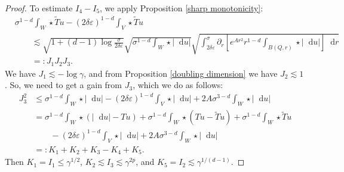 \documentclass[reqno,12pt,letterpaper]{amsart}
\newcommand*\dif{\mathop{}\!\mathrm{d}}
\theoremstyle{definition}
\numberwithin{equation}{section}
\begin{document}
\begin{proof}
To estimate $I_4 - I_5$, we apply Proposition \ref{sharp monotonicity}:
\begin{align*}
&\sigma^{1 - d} \int_W \star \tilde T u - (2\delta\varepsilon)^{1 - d} \int_V \star \tilde T u \\
&\qquad \lesssim \sqrt{1 + (d - 1) \log \frac{\sigma}{2\delta\varepsilon}} \sqrt{\sigma^{1 - d} \int_W \star |\dif u|} \sqrt{\int_{2\delta\varepsilon}^\sigma \partial_r \left[e^{Ar^2} r^{1 - d} \int_{B(Q, r)} \star |\dif u|\right] \dif r}\\
&\qquad =: J_1 J_2 J_3.
\end{align*}
We have $J_1 \lesssim -\log \gamma$, and from Proposition \ref{doubling dimension} we have $J_2 \lesssim 1$.
So, we need to get a gain from $J_3$, which we do as follows:
\begin{align*}
J_3^2 &\leq \sigma^{1 - d} \int_W \star |\dif u| - (2 \delta \varepsilon)^{1 - d} \int_V \star |\dif u| + 2A\sigma^{3 - d} \int_W \star |\dif u| \\
&= \sigma^{1 - d} \int_W \star (|\dif u| - Tu) + \sigma^{1 - d} \int_W \star (Tu - \tilde Tu) + \sigma^{1 - d} \int_W \star \tilde Tu \\
&\qquad - (2 \delta\varepsilon)^{1 - d} \int_V \star |\dif u| + 2A \sigma^{3 - d} \int_W \star |\dif u| \\
&=: K_1 + K_2 + K_3 - K_4 + K_5.
\end{align*}
Then $K_1 = I_1 \leq \gamma^{1/2}$, $K_2 \lesssim I_3 \lesssim \gamma^{2p}$, and $K_5 = I_2 \lesssim \gamma^{1/(d - 1)}$.


\end{proof}
\end{document}
